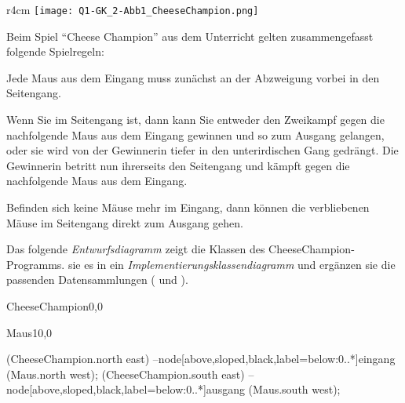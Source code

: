 \begin{aufgabe}[subtitle=(Mit) Datenstrukturen implementieren]
	\begin{rahmen}\footnotesize
		\begin{wrapfigure}{r}{4cm}
			\texttt{[image: Q1-GK\_2-Abb1\_CheeseChampion.png]}
		\end{wrapfigure}
		Beim Spiel \enquote{Cheese Champion} aus dem Unterricht gelten zusammengefasst folgende Spielregeln:
		\begin{smallitemize}
			\item Jede Maus aus dem Eingang muss zunächst an der Abzweigung vorbei in den Seitengang. 
			\item Wenn Sie im Seitengang ist, dann kann Sie entweder den Zweikampf gegen die nachfolgende Maus aus dem Eingang gewinnen und so zum Ausgang gelangen, oder sie wird von der Gewinnerin tiefer in den unterirdischen Gang gedrängt. Die Gewinnerin betritt nun ihrerseits den Seitengang und kämpft gegen die nachfolgende Maus aus dem Eingang.	
			\item Befinden sich keine Mäuse mehr im Eingang, dann können die verbliebenen Mäuse im Seitengang direkt zum Ausgang gehen.
		\end{smallitemize}
	\end{rahmen}
	
	\begin{teilaufgaben}
		
		\teilaufgabe
		Das folgende \emph{Entwurfsdiagramm} zeigt die Klassen des CheeseChampion-Programms.  sie es in ein \emph{Implementierungsklassendiagramm} und ergänzen sie die passenden Datensammlungen ( und ).
		
		\begin{center}
			\begin{klassendiagramm}
				\begin{klasse}[text width=3cm]{CheeseChampion}{0,0}
				\end{klasse}
				\begin{klasse}[text width=3cm]{Maus}{10,0}
				\end{klasse}
				 (CheeseChampion.north east) --node[above,sloped,black,label=below:0..*]{eingang} (Maus.north west);
				 (CheeseChampion.south east) --node[above,sloped,black,label=below:0..*]{ausgang} (Maus.south west);
			\end{klassendiagramm}
		\end{center}
		

\end{teilaufgaben}
\end{aufgabe}
